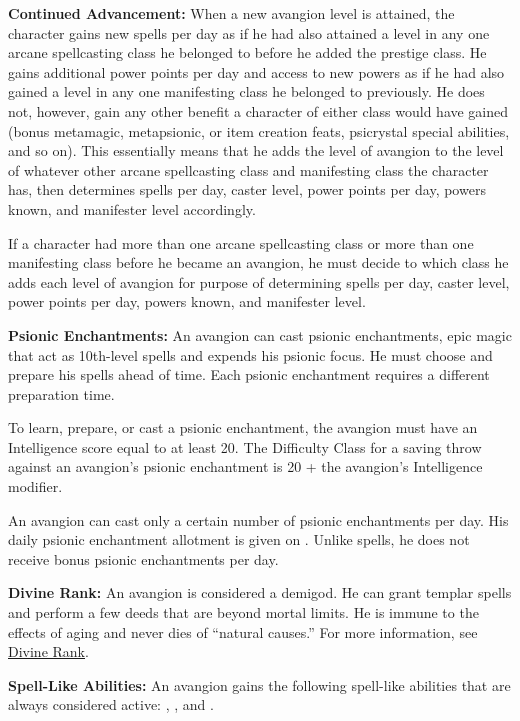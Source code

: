 {
\textbf{Continued Advancement:} When a new avangion level is attained, the character gains new spells per day as if he had also attained a level in any one arcane spellcasting class he belonged to before he added the prestige class. He gains additional power points per day and access to new powers as if he had also gained a level in any one manifesting class he belonged to previously. He does not, however, gain any other benefit a character of either class would have gained (bonus metamagic, metapsionic, or item creation feats, psicrystal special abilities, and so on). This essentially means that he adds the level of avangion to the level of whatever other arcane spellcasting class and manifesting class the character has, then determines spells per day, caster level, power points per day, powers known, and manifester level accordingly.

If a character had more than one arcane spellcasting class or more than one manifesting class before he became an avangion, he must decide to which class he adds each level of avangion for purpose of determining spells per day, caster level, power points per day, powers known, and manifester level.

\textbf{Psionic Enchantments:} An avangion can cast psionic enchantments, epic magic that act as 10th-level spells and expends his psionic focus. He must choose and prepare his spells ahead of time. Each psionic enchantment requires a different preparation time.

To learn, prepare, or cast a psionic enchantment, the avangion must have an Intelligence score equal to at least 20. The Difficulty Class for a saving throw against an avangion's psionic enchantment is 20 + the avangion's Intelligence modifier.

An avangion can cast only a certain number of psionic enchantments per day. His daily psionic enchantment allotment is given on . Unlike spells, he does not receive bonus psionic enchantments per day.

\textbf{Divine Rank:} An avangion is considered a demigod. He can grant templar spells and perform a few deeds that are beyond mortal limits. He is immune to the effects of aging and never dies of ``natural causes.'' For more information, see \hyperref[Divine Rank]{Divine Rank}.

\textbf{Spell-Like Abilities:} An avangion gains the following spell-like abilities that are always considered active: , , and .


}
